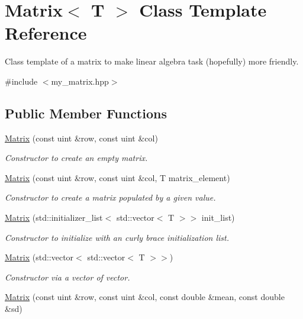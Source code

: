 \hypertarget{classMatrix}{}\section{Matrix$<$ T $>$ Class Template Reference}
\label{classMatrix}


Class template of a matrix to make linear algebra task (hopefully) more friendly.  




{\ttfamily \#include $<$my\+\_\+matrix.\+hpp$>$}

\subsection*{Public Member Functions}
\begin{DoxyCompactItemize}
\item 
\hyperlink{classMatrix_a0e344d342fe0ad5b208c69f9aa909306}{Matrix} (const uint \&row, const uint \&col)
\begin{DoxyCompactList}\small\item\em Constructor to create an empty matrix. \end{DoxyCompactList}\item 
\hyperlink{classMatrix_acb7869d94f5e02b024a0d39d03ec78bd}{Matrix} (const uint \&row, const uint \&col, T matrix\+\_\+element)
\begin{DoxyCompactList}\small\item\em Constructor to create a matrix populated by a given value. \end{DoxyCompactList}\item 
\hyperlink{classMatrix_ad9291e60f6af703b79de72d8bcfa777b}{Matrix} (std\+::initializer\+\_\+list$<$ std\+::vector$<$ T $>$$>$ init\+\_\+list)
\begin{DoxyCompactList}\small\item\em Constructor to initialize with an curly brace initialization list. \end{DoxyCompactList}\item 
\hyperlink{classMatrix_aace9a20f83d726ffb813fe40ea16bf84}{Matrix} (std\+::vector$<$ std\+::vector$<$ T $>$$>$)
\begin{DoxyCompactList}\small\item\em Constructor via a vector of vector. \end{DoxyCompactList}\item 
\hyperlink{classMatrix_a2b6e9de6b55a40317911aa6c7adfa72a}{Matrix} (const uint \&row, const uint \&col, const double \&mean, const double \&sd)

\end{DoxyCompactItemize}

